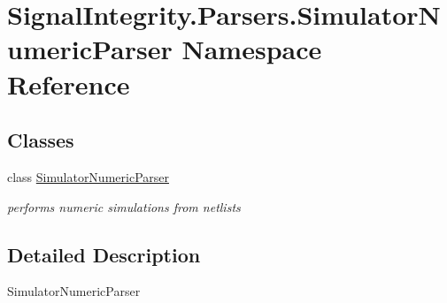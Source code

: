 \hypertarget{namespaceSignalIntegrity_1_1Parsers_1_1SimulatorNumericParser}{}\section{Signal\+Integrity.\+Parsers.\+Simulator\+Numeric\+Parser Namespace Reference}
\label{namespaceSignalIntegrity_1_1Parsers_1_1SimulatorNumericParser}
\subsection*{Classes}
\begin{DoxyCompactItemize}
\item 
class \hyperlink{classSignalIntegrity_1_1Parsers_1_1SimulatorNumericParser_1_1SimulatorNumericParser}{Simulator\+Numeric\+Parser}
\begin{DoxyCompactList}\small\item\em performs numeric simulations from netlists \end{DoxyCompactList}\end{DoxyCompactItemize}


\subsection{Detailed Description}
\begin{DoxyVerb}SimulatorNumericParser\end{DoxyVerb}
 